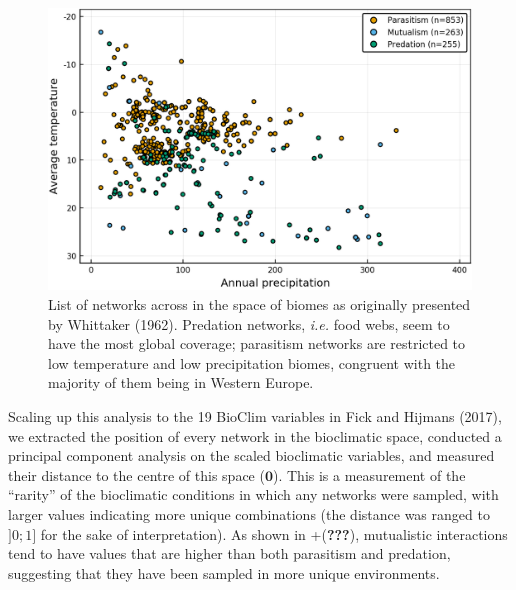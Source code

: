 \documentclass[11pt]{article}
\begin{document}
\begin{figure}
\hypertarget{fig:biomes}{%
\centering
\includegraphics{figures/networks_by_biomes.png}
\caption{List of networks across in the space of biomes as originally
presented by Whittaker (1962). Predation networks, \emph{i.e.} food
webs, seem to have the most global coverage; parasitism networks are
restricted to low temperature and low precipitation biomes, congruent
with the majority of them being in Western Europe.}\label{fig:biomes}
}
\end{figure}

Scaling up this analysis to the 19 BioClim variables in Fick and Hijmans
(2017), we extracted the position of every network in the bioclimatic
space, conducted a principal component analysis on the scaled
bioclimatic variables, and measured their distance to the centre of this
space (\(\mathbf{0}\)). This is a measurement of the ``rarity'' of the
bioclimatic conditions in which any networks were sampled, with larger
values indicating more unique combinations (the distance was ranged to
\(]0;1]\) for the sake of interpretation). As shown in
+({\textbf{???}}), mutualistic interactions tend to have values that are
higher than both parasitism and predation, suggesting that they have
been sampled in more unique environments.
\end{document}
